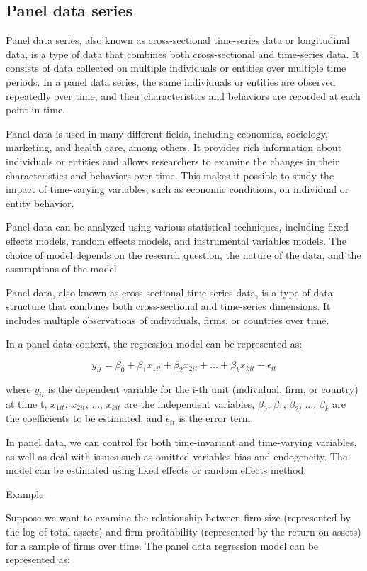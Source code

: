 \documentclass[12pt, a4paper, oneside]{article}
\begin{document}
\subsection{ Panel data series} 
Panel data series, also known as cross-sectional time-series data or longitudinal data, is a type of data that combines both cross-sectional and time-series data. It consists of data collected on multiple individuals or entities over multiple time periods. In a panel data series, the same individuals or entities are observed repeatedly over time, and their characteristics and behaviors are recorded at each point in time.

Panel data is used in many different fields, including economics, sociology, marketing, and health care, among others. It provides rich information about individuals or entities and allows researchers to examine the changes in their characteristics and behaviors over time. This makes it possible to study the impact of time-varying variables, such as economic conditions, on individual or entity behavior.

Panel data can be analyzed using various statistical techniques, including fixed effects models, random effects models, and instrumental variables models. The choice of model depends on the research question, the nature of the data, and the assumptions of the model.

Panel data, also known as cross-sectional time-series data, is a type of data structure that combines both cross-sectional and time-series dimensions. It includes multiple observations of individuals, firms, or countries over time.

In a panel data context, the regression model can be represented as:

$$y_{it} = \beta_0 + \beta_1 x_{1it} + \beta_2 x_{2it} + \dots + \beta_k x_{kit} + \epsilon_{it}$$

where $y_{it}$ is the dependent variable for the i-th unit (individual, firm, or country) at time t, $x_{1it}$, $x_{2it}$, ..., $x_{kit}$ are the independent variables, $\beta_0$, $\beta_1$, $\beta_2$, ..., $\beta_k$ are the coefficients to be estimated, and $\epsilon_{it}$ is the error term.

In panel data, we can control for both time-invariant and time-varying variables, as well as deal with issues such as omitted variables bias and endogeneity. The model can be estimated using fixed effects or random effects method.

Example:

Suppose we want to examine the relationship between firm size (represented by the log of total assets) and firm profitability (represented by the return on assets) for a sample of firms over time. The panel data regression model can be represented as:
\end{document}
